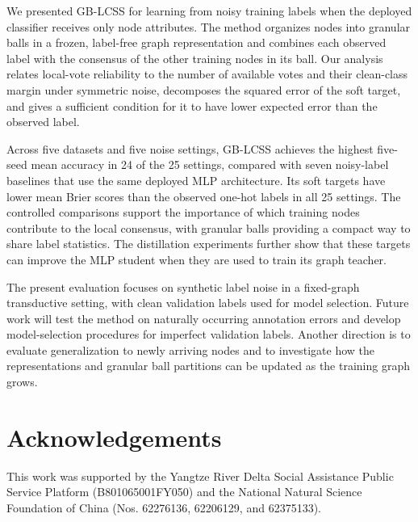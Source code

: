 \documentclass[10pt,letterpaper,nopreprintline]{elsarticle}
\theoremstyle{definition}
\theoremstyle{plain}
\begin{document}
We presented GB-LCSS for learning from noisy training labels when the deployed classifier receives only node attributes. The method organizes nodes into granular balls in a frozen, label-free graph representation and combines each observed label with the consensus of the other training nodes in its ball. Our analysis relates local-vote reliability to the number of available votes and their clean-class margin under symmetric noise, decomposes the squared error of the soft target, and gives a sufficient condition for it to have lower expected error than the observed label.

Across five datasets and five noise settings, GB-LCSS achieves the highest five-seed mean accuracy in 24 of the 25 settings, compared with seven noisy-label baselines that use the same deployed MLP architecture. Its soft targets have lower mean Brier scores than the observed one-hot labels in all 25 settings. The controlled comparisons support the importance of which training nodes contribute to the local consensus, with granular balls providing a compact way to share label statistics. The distillation experiments further show that these targets can improve the MLP student when they are used to train its graph teacher.

The present evaluation focuses on synthetic label noise in a fixed-graph transductive setting, with clean validation labels used for model selection. Future work will test the method on naturally occurring annotation errors and develop model-selection procedures for imperfect validation labels. Another direction is to evaluate generalization to newly arriving nodes and to investigate how the representations and granular ball partitions can be updated as the training graph grows.

\FloatBarrier

\section*{Acknowledgements}

This work was supported by the Yangtze River Delta Social Assistance Public Service Platform (B801065001FY050) and the National Natural Science Foundation of China (Nos. 62276136, 62206129, and 62375133).

\setlength{\bibsep}{0.5pt plus 0.2pt minus 0.2pt}



\end{document}

